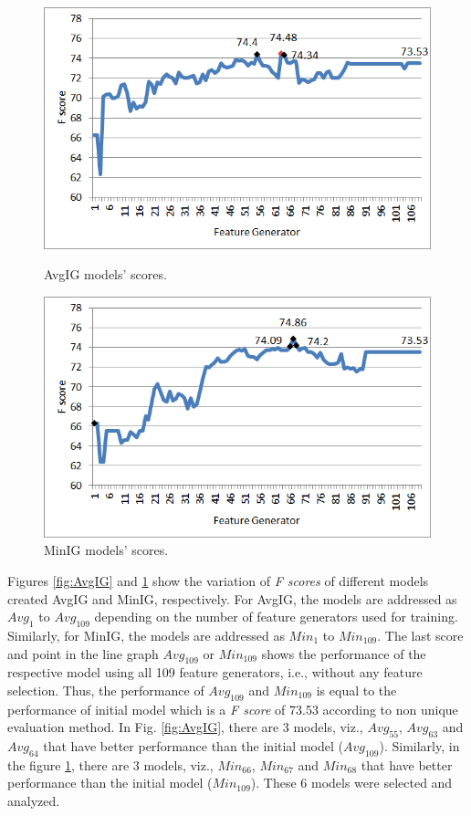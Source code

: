 \begin{figure}
\centering
\begin{minipage}{.5\textwidth}
  \centering
  \includegraphics[width=.95\textwidth]{figures/AvgIGAnalysis.png}
  \caption{AvgIG models' scores.}
  \label{fig:AvgIG}
\end{minipage}%
\begin{minipage}{.5\textwidth}
  \centering
  \includegraphics[width=.95\textwidth]{figures/MinIGAnalysis.png}
  \caption{MinIG models' scores.}
  \label{fig:MinIG}
\end{minipage}
\end{figure}

Figures \ref{fig:AvgIG} and \ref{fig:MinIG} show the variation of \textit{F scores} of different models created AvgIG and MinIG, respectively. For AvgIG, the models are addressed as $Avg_1$ to $Avg_{109}$ depending on the number of feature generators used for training. Similarly, for MinIG, the models are addressed as $Min_{1}$ to $Min_{109}$. The last score and point in the line graph $Avg_{109}$ or $Min_{109}$ shows the performance of the respective model using all 109 feature generators, i.e., without any feature selection. Thus, the performance of $Avg_{109}$ and $Min_{109}$ is equal to the performance of initial model which is a \textit{F score} of 73.53 according to non unique evaluation method. In Fig. \ref{fig:AvgIG}, there are 3 models, viz., $Avg_{55}$, $Avg_{63}$ and $Avg_{64}$ that have better performance than the initial model ($Avg_{109}$). Similarly, in the figure \ref{fig:MinIG}, there are 3 models, viz., $Min_{66}$, $Min_{67}$ and $Min_{68}$ that have better performance than the initial model ($Min_{109}$). These 6 models were selected and analyzed.

